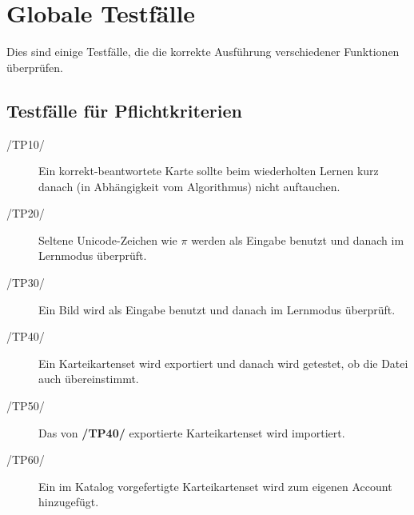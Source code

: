 \section{Globale Testfälle}
Dies sind einige Testfälle, die die korrekte Ausführung verschiedener Funktionen überprüfen.

\subsection{Testfälle für Pflichtkriterien}
\begin{description}
	\item[/TP10/] Ein korrekt-beantwortete Karte sollte beim wiederholten Lernen kurz danach (in Abhängigkeit vom Algorithmus) nicht auftauchen.
	\item[/TP20/] Seltene Unicode-Zeichen wie \(\pi\) werden als Eingabe benutzt und danach im Lernmodus überprüft.
	\item[/TP30/] Ein Bild wird als Eingabe benutzt und danach im Lernmodus überprüft.
	\item[/TP40/] Ein Karteikartenset wird exportiert und danach wird getestet, ob die Datei auch übereinstimmt.
	\item[/TP50/] Das von \textbf{/TP40/} exportierte Karteikartenset wird importiert.
	\item[/TP60/] Ein im Katalog vorgefertigte Karteikartenset wird zum eigenen Account hinzugefügt.
\end{description}
